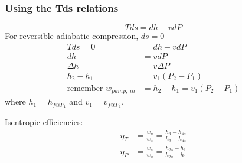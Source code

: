 \subsubsection{Using the Tds relations}
\begin{equation}
  Tds = dh - vdP
\end{equation}
For reversible adiabatic compression, $ds = 0$
\begin{align}
  Tds = 0                           & = dh - vdP                    \\
  dh                                & = vdP                         \\
  \Delta h                          & = v\Delta P                   \\
  h_2 - h_1                         & = v_1 (P_2 - P_1)             \\
  \textrm{remember } w_{pump,\  in} & = h_2 - h_1 = v_1 (P_2 - P_1)
\end{align}
where $h_1 = h_{f@P_1}$ and $v_1 = v_{f@P_1}$.

Isentropic efficiencies:
\begin{align}
  \eta_T & = \frac{w_a}{w_s} = \frac{h_3 - h_{4a}}{h_3 - h_{4s}}     \\
  \eta_P & = \frac{w_s}{w_a} = \frac{h_{2s} - h_{1}}{h_{2a} - h_{1}}
\end{align}